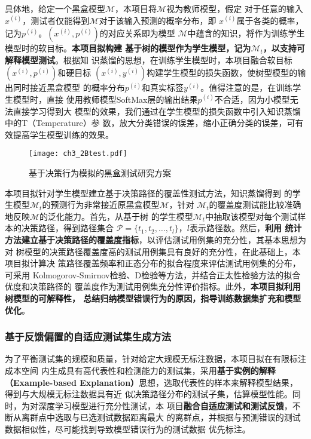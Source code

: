 具体地，给定一个黑盒模型$\mathcal M$，本项目将$\mathcal M$视为教师模型，假定
对于任意的输入$x^{(i)}$，测试者仅能得到$\mathcal M$对于该输入预测的概率分布，即
$x^{(i)}$属于各类的概率，记为$p^{(i)}$。$(x^{(i)}, p^{(i)})$的对应关系即为模型
$\mathcal M$中蕴含的知识，将作为训练学生模型时的软目标。\textbf{本项目拟构建
基于树的模型作为学生模型，记为$\mathcal M_t$，以支持可解释模型测试}。根据知
识蒸馏的思想，在训练学生模型时，本项目融合软目标$(x^{(i)}, p^{(i)})$和硬目标
$(x^{(i)}, y^{(i)})$构建学生模型的损失函数，使树型模型的输出同时接近黑盒模型
的概率分布$p^{(i)}$和真实标签$y^{(i)}$。值得注意的是，在训练学生模型时，直接
使用教师模型SoftMax层的输出结果$p^{(i)}$不合适，因为小模型无法直接学习得到大
模型的效果，我们通过在学生模型的损失函数中引入知识蒸馏中的T（Temperature）参
数，放大分类错误的误差，缩小正确分类的误差，可有效提高学生模型训练的效果。

\begin{figure}[htp]
    \begin{small}
        \begin{center}
            \texttt{[image: ch3\_2Btest.pdf]}
        \end{center}
        \caption{基于决策行为模拟的黑盒测试研究方案}
        \label{fig:ch3:2Btest}
    \end{small}
\end{figure}


{本项目拟针对学生模型建立基于决策路径的覆盖性测试方法}，知识蒸馏得到
的学生模型$\mathcal M_t$的预测行为非常接近原黑盒模型$\mathcal M$，针对
$\mathcal M_t$的覆盖度测试能比较准确地反映$\mathcal M$的泛化能力。首先，从基于树
的学生模型$\mathcal M_t$中抽取该模型对每个测试样本的决策路径，得到路径集合
$\mathcal P=\{t_1, t_2,\dots, t_l\}$，$l$表示路径数。然后，\textbf{利用
统计方法建立基于决策路径的覆盖度指标}，以评估测试用例集的充分性，其基本思想为对
树模型的决策路径覆盖度高的测试用例集具有良好的充分性，在此基础上，本项目拟计算决
策路径覆盖频率和正态分布的拟合程度来评估测试用例集的分布，可采用
Kolmogorov-Smirnov检验、D检验等方法，并结合正太性检验方法的拟合优度和决策路径的
覆盖度作为测试用例集充分性评价指标。此外，\textbf{本项目拟利用树模型的可解释性，
总结归纳模型错误行为的原因，指导训练数据集扩充和模型优化}。



\subsubsection{基于反馈偏置的自适应测试集生成方法}\label{ch3_3}

为了平衡测试集的规模和质量，针对给定大规模无标注数据，本项目拟在有限标注成本空间
内生成具有高代表性和检测能力的测试集，采用\textbf{基于实例的解释（Example-based
Explanation）}思想，选取代表性的样本来解释模型结果，得到与大规模无标注数据具有近
似决策路径分布的测试子集，估算模型性能。同时，为对深度学习模型进行充分性测试，本
项目\textbf{融合自适应测试和测试反馈}，不断从离群点中选取与已选测试数据距离最大
的离群点，并根据与预测错误的测试数据相似性，尽可能找到导致模型错误行为的测试数据
优先标注。

